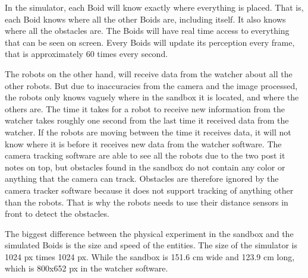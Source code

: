 In the simulator, each Boid will know exactly where everything is placed. That is, each Boid knows where all the other Boids are, including itself. It also knows where all the obstacles are. The Boids will have real time access to everything that can be seen on screen. Every Boids will update its perception every frame, that is approximately 60 times every second.

The robots on the other hand, will receive data from the watcher about all the other robots. But due to inaccuracies from the camera and the image processed, the robots only knows vaguely where in the sandbox it is located, and where the others are. The time it takes for a robot to receive new information from the watcher takes roughly one second from the last time it received data from the watcher. If the robots are moving between the time it receives data, it will not know where it is before it receives new data from the watcher software. The camera tracking software are able to see all the robots due to the two post it notes on top, but obstacles found in the sandbox do not contain any color or anything that the camera can track. Obstacles are therefore ignored by the camera tracker software because it does not support tracking of anything other than the robots. That is why the robots needs to use their distance sensors in front to detect the obstacles.

The biggest difference between the physical experiment in the sandbox and the simulated Boids is the size and speed of the entities. The size of the simulator is 1024 px times 1024 px. While the sandbox is 151.6 cm wide and 123.9 cm long, which is 800x652 px in the watcher software.


